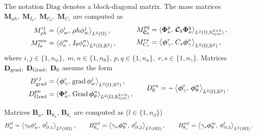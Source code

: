 The notation $\mathrm{Diag}$ denotes a block-diagonal matrix. The mass matrices $\mathbf{M}_{\rho h}, \; \mathbf{M}_{I_\theta}, \; \mathbf{M}_{\bm{\mathcal{C}}_b}, \; \mathbf{M}_{{C}_s}$ are computed as
\begin{equation}
\begin{aligned}
M_{\rho h}^{ij} &= \inner[L^2(\Omega)]{\phi_w^i}{\rho h \phi_w^j}, \\
M_{I_\theta}^{mn} &= \inner[L^2(\Omega, \mathbb{R}^{2})]{\phi_\kappa^m}{I_\theta \phi_\kappa^n},
\end{aligned} \qquad
\begin{aligned}
\quad M_{\bm{\mathcal{C}}_b}^{pq} &= \inner[L^2(\Omega, \mathbb{R}^{2\times 2}_{\text{sym}})]{\bm\Phi_\kappa^p}{\bm{\mathcal{C}}_b \bm\Phi_\kappa^q}, \\
M_{C_s}^{rs} &= \inner[L^2(\Omega, \mathbb{R}^{2})]{\bm\phi_\gamma^r}{C_s \bm\phi_\gamma^s}, 
\end{aligned}
\end{equation}
where $i, j \in \{1, n_w\}, \; m, n \in \{1, n_\theta\}, \, p, q \in \{1, n_\kappa\}, \; r, s \in \{1, n_\gamma\}$. Matrices $\mathbf{D}_{\grad}, \; \mathbf{D}_{\Grad}, \; \mathbf{D}_{0}$ assume the form
\begin{equation}
\begin{aligned}
D_{\grad}^{rj} &= \inner[L^2(\Omega, \mathbb{R}^2)]{\bm\phi_\gamma^r}{\grad \phi_w^j}, \\ D_{\Grad}^{pn} &= \inner[L^2(\Omega, \mathbb{R}^{2\times 2}_{\text{sym}})]{\bm\Phi_\kappa^p}{\Grad \bm\phi_\theta^n},
\end{aligned} \qquad
D_{0}^{rn} = -\inner[L^2(\Omega, \mathbb{R}^2)]{\bm\phi_\gamma^r}{\bm\phi_\theta^n}.
\end{equation}


Matrices $\mathbf{B}_w, \, \mathbf{B}_{\theta_n}, \, \mathbf{B}_{\theta_s}$ are computed as ($l \in \{1, n_\partial\}$)
\begin{equation}
{B}_w^{il} = \inner[L^2(\partial\Omega)]{\gamma_0 \phi_w^i}{\phi_{\partial, 1}^l}, \qquad {B}_{\theta_n}^{ml} = \inner[L^2(\partial\Omega)]{\gamma_n \bm\phi_\theta^m}{\phi_{\partial, 2}^l},  \qquad {B}_{\theta_s}^{ml} = \inner[L^2(\partial\Omega)]{\gamma_s \bm\phi_\theta^m}{\phi_{\partial, 3}^l}.
\end{equation}

